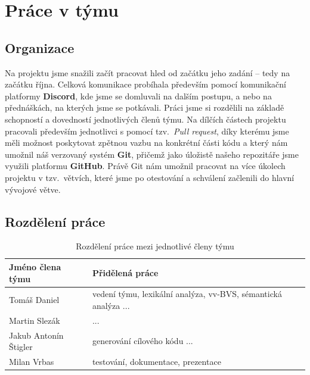 \documentclass[a4paper, 12pt]{article} %
\begin{document}
    \newpage
    \section{Práce v týmu}
        \subsection{Organizace}
            Na projektu jsme snažili začít pracovat hled od začátku jeho zadání -- tedy
            na začátku října. Celková komunikace probíhala především pomocí komunikační
            platformy \textbf{Discord}, kde jsme se domluvali na dalším postupu, a nebo 
            na přednáškách, na kterých jsme se potkávali. Práci jsme si rozdělili na 
            základě schopností a dovedností jednotlivých členů týmu. Na dílčích částech
            projektu pracovali především jednotlivci s pomocí tzv.\ \textit{Pull request}, 
            díky kterému jsme měli možnost poskytovat zpětnou vazbu na konkrétní části kódu 
            a který nám umožnil náš verzovaný systém \textbf{Git}, přičemž jako úložistě 
            našeho repozitáře jsme využili platformu \textbf{GitHub}. Právě Git nám umožnil
            pracovat na více úkolech projektu v tzv.\ větvích, které jsme po otestování a 
            schválení začlenili do hlavní vývojové větve.

        \subsection{Rozdělení práce}            
            \begin{table}[h]
                \centering
                \begin{tabular}{| l | l |}
                    \hline
                    \textbf{Jméno člena týmu} & \textbf{Přidělená práce} \\
                    \hline
                    Tomáš Daniel            &  vedení týmu, lexikální analýza, vv-BVS, sémantická analýza ...\\
                    Martin Slezák           &  ...\\
                    Jakub Antonín Štigler   &  generování cílového kódu ...\\
                    Milan Vrbas             & testování, dokumentace, prezentace \\
                    \hline
                \end{tabular}
                \caption{Rozdělení práce mezi jednotlivé členy týmu}
            \end{table}
\end{document}
